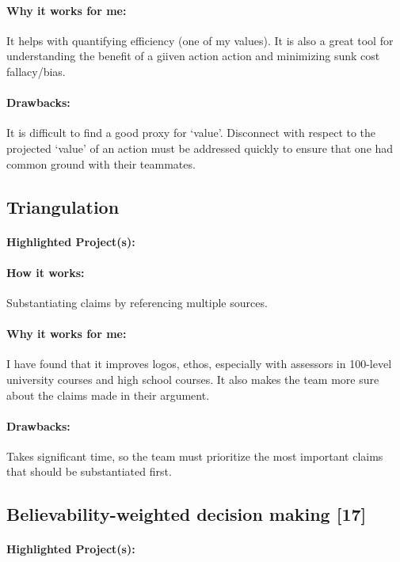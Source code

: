 \documentclass[a4paper,12pt]{article}
\begin{document}
\paragraph{Why it works for me: }
It helps with quantifying efficiency (one of my values). It is also a great tool for understanding the benefit of a giiven action action and minimizing sunk cost fallacy/bias.

\paragraph{Drawbacks: }
It is difficult to find a good proxy for ‘value’. Disconnect with respect to the projected ‘value’ of an action must be addressed quickly to ensure that one had common ground with their teammates.

\subsection{Triangulation}
\paragraph{Highlighted Project(s): }

\paragraph{How it works: }
Substantiating claims by referencing multiple sources.

\paragraph{Why it works for me: }
I have found that it improves logos, ethos, especially with assessors in 100-level university courses and high school courses. It also makes the team more sure about the claims made in their argument.

\paragraph{Drawbacks: }
Takes significant time, so the team must prioritize the most important claims that should be substantiated first.


\subsection{Believability-weighted decision making [17]}
\paragraph{Highlighted Project(s): }
\end{document}

